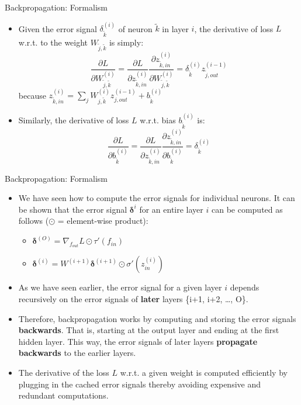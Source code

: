 \begin{frame} {Backpropagation: Formalism}
  \begin{itemize}
    \item Given the error signal $\delta_{\tilde{k}}^{(i)}$ of neuron $\tilde{k}$ in layer $i$, the derivative of loss $L$ w.r.t. to the weight $W_{\tilde{j},\tilde{k}}$ is simply:
        $$
           \frac{\partial L}{\partial W_{\tilde{j},\tilde{k}}^{(i)}} = \frac{\partial L}{\partial z_{\tilde{k},in}^{(i)}} \frac{\partial z_{\tilde{k},in}^{(i)}}{\partial W_{\tilde{j},\tilde{k}}^{(i)}} 
           = \delta_{\tilde{k}}^{(i)} z_{\tilde{j},out}^{(i-1)} $$
        because $z_{\tilde{k},in}^{(i)} = \sum_j W_{j,\tilde{k}}^{(i)}z_{j,out}^{(i-1)}  + b_{\tilde{k}}^{(i)}$
    \item Similarly, the derivative of loss $L$ w.r.t. bias $b_{\tilde{k}}^{(i)}$ is:
      $$ \frac{\partial L}{\partial b_{\tilde{k}}^{(i)}} = \frac{\partial L}{\partial z_{\tilde{k},in}^{(i)}} \frac{\partial z_{\tilde{k},in}^{(i)}}{\partial b_{\tilde{k}}^{(i)}} = \delta_{\tilde{k}}^{(i)}$$
  \end{itemize}
\end{frame}

\begin{frame} {Backpropagation: Formalism}
\begin{itemize}
\item We have seen how to compute the error signals for individual neurons. It can be shown that the error signal $\bm{\delta}^{i}$ for an entire layer $i$ can be computed as follows ($\odot$ = element-wise product):
\begin{itemize}
\item $\bm{\delta}^{(O)} = \nabla_{f_{out}}L \odot \tau'(f_{in})$
\item $\bm{\delta}^{(i)} = W^{(i+1)}\bm{\delta}^{(i+1)} \odot \sigma'(z_{in}^{(i)})$
\end{itemize}
\item As we have seen earlier, the error signal for a given layer $i$ depends recursively on the error signals of \textbf{later} layers \{i+1, i+2, \ldots , O\}.
\item Therefore, backpropagation works by computing and storing the error signals \textbf{backwards}. That is, starting at the output layer and ending at the first hidden layer. This way, the error signals of later layers \textbf{propagate backwards} to the earlier layers.
\item The derivative of the loss $L$ w.r.t. a given weight is computed efficiently by plugging in the cached error signals thereby avoiding expensive and redundant computations. 
\end{itemize}
\end{frame}

\endlecture
